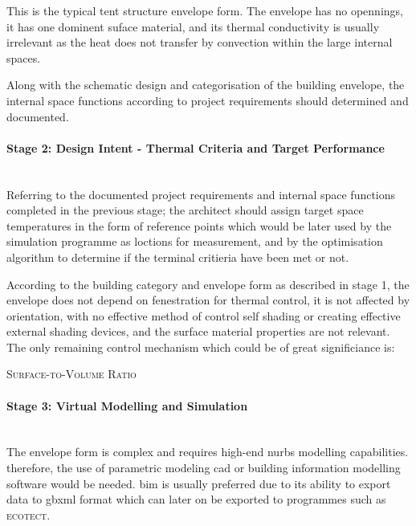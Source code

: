 This is the typical tent structure envelope form. The envelope has no opennings, it has one dominent suface material, and its thermal conductivity is usually irrelevant as the heat does not transfer by convection within the large internal spaces.

Along with the schematic design and categorisation of the building envelope, the internal space functions according to project requirements should determined and documented.

\paragraph{Stage 2: Design Intent - Thermal Criteria and Target Performance}\mbox{}\\

Referring to the documented project requirements and internal space functions completed in the previous stage; the architect should assign target space temperatures in the form of reference points which would be later used by the simulation programme as loctions for measurement, and by the optimisation algorithm to determine if the terminal critieria have been met or not.

According to the building category and envelope form as described in stage 1, the envelope does not depend on fenestration for thermal control, it is not affected by orientation, with no effective method of control self shading or creating effective external shading devices, and the surface material properties are not relevant. The only remaining control mechanism which could be of great significiance is: 

\begin{compactenum}
	\item \textsc{Surface-to-Volume Ratio}
\end{compactenum}

\paragraph{Stage 3: Virtual Modelling and Simulation}\mbox{}\\

The envelope form is complex and requires high-end nurbs modelling capabilities. therefore, the use of parametric modeling cad or building information modelling software would be needed. bim is usually preferred due to its ability to export data to gbxml format which can later on be exported to programmes such as \textsc{ecotect}.

